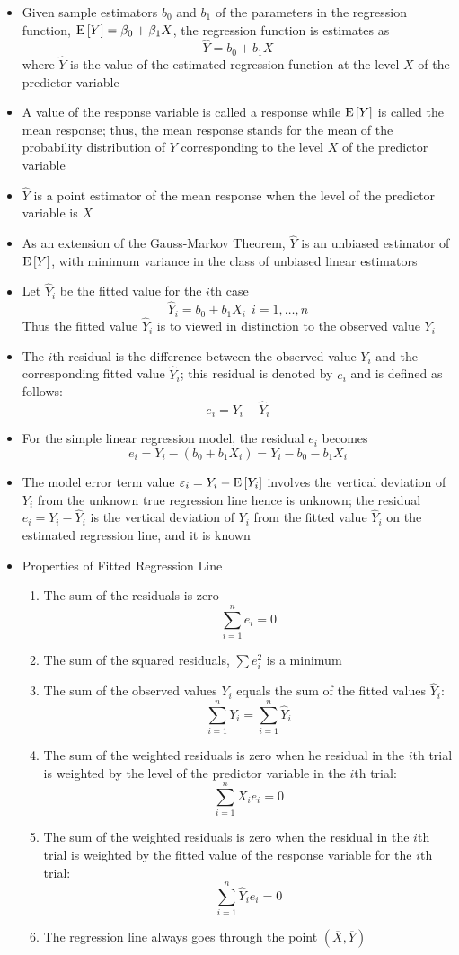 \begin{itemize}
\item Given sample estimators $b_0$ and $b_1$ of the parameters in the regression function, $\mathrm{E}\left[ Y \right] = \beta_0 + \beta_1X$, the regression function is estimates as $$ \hat{Y} = b_0 + b_1X $$ where $\hat{Y}$ is the value of the estimated regression function at the level $X$ of the predictor variable 
\item A value of the response variable is called a response while $\mathrm{E}\left[ Y \right]$ is called the mean response; thus, the mean response stands for the mean of the probability distribution of $Y$ corresponding to the level $X$ of the predictor variable 
\item $\hat{Y}$ is a point estimator of the mean response when the level of the predictor variable is $X$ 
\item As an extension of the Gauss-Markov Theorem, $\hat{Y}$ is an unbiased estimator of $\mathrm{E}\left[ Y \right]$, with minimum variance in the class of unbiased linear estimators 
\item Let $\hat{Y}_i$ be the fitted value for the $i$th case $$ \hat{Y}_i = b_0 + b_1X_i ~~ i = 1,\dots,n$$ Thus the fitted value $\hat{Y}_i$ is to viewed in distinction to the observed value $Y_i$
\item The $i$th residual is the difference between the observed value $Y_i$ and the corresponding fitted value $\hat{Y}_i$; this residual is denoted by $e_i$ and is defined as follows: $$ e_i = Y_i - \hat{Y}_i $$ 
\item For the simple linear regression model, the residual $e_i$ becomes $$ e_i = Y_i - (b_0 + b_1X_i) = Y_i - b_0 - b_1X_i $$ 
\item The model error term value $\varepsilon_i = Y_i - \mathrm{E}\left[ Y_i \right]$ involves the vertical deviation of $Y_i$ from the unknown true regression line hence is unknown; the residual $e_i = Y_i - \hat{Y}_i$ is the vertical deviation of $Y_i$ from the fitted value $\hat{Y}_i$ on the estimated regression line, and it is known
\item Properties of Fitted Regression Line \begin{enumerate} 
\item The sum of the residuals is zero $$ \sum_{i=1}^n e_i = 0 $$ 
\item The sum of the squared residuals, $\sum e_i^2$ is a minimum 
\item The sum of the observed values $Y_i$ equals the sum of the fitted values $\hat{Y}_i$: $$ \sum_{i=1}^n Y_i = \sum_{i=1}^n \hat{Y}_i $$ 
\item The sum of the weighted residuals is zero when he residual in the $i$th trial is weighted by the level of the predictor variable in the $i$th trial: $$ \sum_{i=1}^n X_ie_i = 0 $$ 
\item The sum of the weighted residuals is zero when the residual in the $i$th trial is weighted by the fitted value of the response variable for the $i$th trial: $$ \sum_{i=1}^n \hat{Y}_ie_i = 0 $$ 
\item The regression line always goes through the point $(\overline{X}, \overline{Y})$ \end{enumerate} 
\end{itemize}

